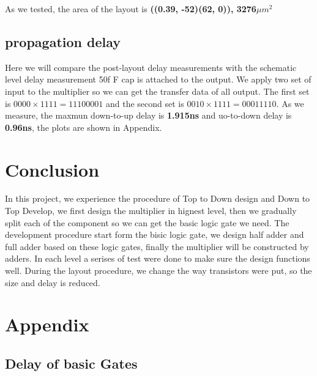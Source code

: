 \documentclass[conference]{IEEEtran}
\begin{document}
As we tested, the area of the layout is \textbf{((0.39, -52)(62, 0)), 3276$\mu m^2$}

\subsection{propagation delay}

Here we will compare the post-layout delay measurements with the schematic level delay measurement 50f F cap is attached to the output. We apply two set of input to the multiplier so we can get the transfer data of all output. The first set is $0000 \times 1111 = 11100001$ and the second set is $0010 \times 1111 = 00011110$. As we measure, the maxmun down-to-up delay is \textbf{1.915ns} and uo-to-down delay is \textbf{0.96ns}, the plots are shown in Appendix.

\section{Conclusion}

In this project, we experience the procedure of Top to Down design and Down to Top Develop, we first design the multiplier in hignest level, then we gradually split each of the component so we can get the basic logic gate we need. The development procedure start form the bisic logic gate, we design half adder and full adder based on these logic gates, finally the multiplier will be constructed by adders. In each level a serises of test were done to make sure the design functions well. During the layout procedure, we change the way transistors were put, so the size and delay is reduced.


% 




\newpage
\section{Appendix}

\subsection{Delay of basic Gates}

\end{document}
